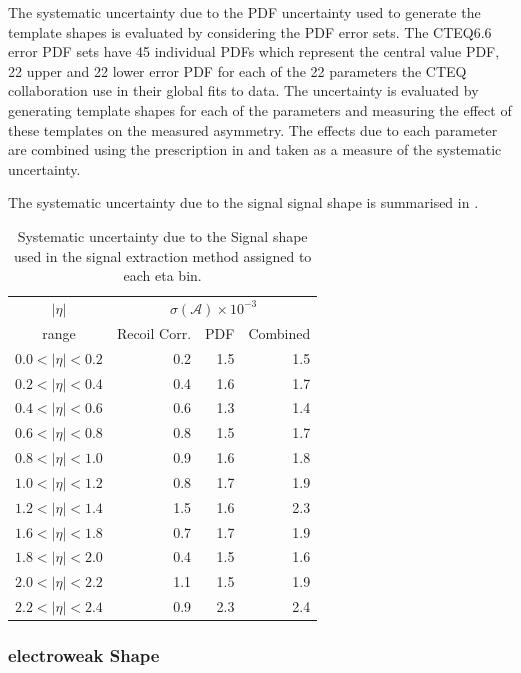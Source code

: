 The systematic uncertainty due to the {PDF} uncertainty used to generate the
template shapes is evaluated by considering the {PDF} error sets. The
CTEQ6.6\cite{lai2010vv} error {PDF} sets have 45 individual PDFs which represent
the central value {PDF}, 22 upper and 22 lower error {PDF} for each of the 22
parameters the CTEQ collaboration use in their global fits to data.  The
uncertainty is evaluated by generating template shapes for each of the
parameters and measuring the effect of these templates on the measured
asymmetry. The effects due to each parameter are combined using the
prescription in  and taken as a measure of the
systematic uncertainty.

The systematic uncertainty due to the signal \ETm signal shape is summarised in
.

\begin{table}[htbp]
\begin{center}
\begin{tabular}{crrr}
\toprule
$|\eta|$  & \multicolumn{3}{c}{$\sigma(\mathcal{A}) \times 10^{-3}$}\\
range     & Recoil Corr.& PDF & Combined \\
\midrule
$0.0<|\eta|<0.2$ &  0.2 &  1.5  & 1.5 \\
$0.2<|\eta|<0.4$ &  0.4 &  1.6  & 1.7 \\
$0.4<|\eta|<0.6$ &  0.6 &  1.3  & 1.4 \\
$0.6<|\eta|<0.8$ &  0.8 &  1.5  & 1.7 \\
$0.8<|\eta|<1.0$ &  0.9 &  1.6  & 1.8 \\
$1.0<|\eta|<1.2$ &  0.8 &  1.7  & 1.9 \\
$1.2<|\eta|<1.4$ &  1.5 &  1.6  & 2.3 \\
$1.6<|\eta|<1.8$ &  0.7 &  1.7  & 1.9 \\
$1.8<|\eta|<2.0$ &  0.4 &  1.5  & 1.6 \\
$2.0<|\eta|<2.2$ &  1.1 &  1.5  & 1.9 \\
$2.2<|\eta|<2.4$ &  0.9 &  2.3  & 2.4 \\
\bottomrule
\end{tabular}
\caption{\label{tab:updatedsystsig} Systematic uncertainty due to the Signal \MET shape
used in the signal extraction method assigned to each eta bin\cite{bendavid2011electron}.}
\end{center}
\end{table}

\subsubsection{electroweak \ETm Shape}

